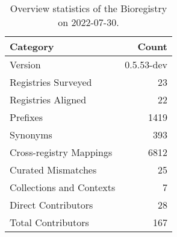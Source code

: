 \begin{table}
\centering
\caption{Overview statistics of the Bioregistry on 2022-07-30.}
\label{tab:bioregistry-summary}
\begin{tabular}{lr}
\toprule
                Category &      Count \\
\midrule
                 Version & 0.5.53-dev \\
     Registries Surveyed &         23 \\
      Registries Aligned &         22 \\
                Prefixes &       1419 \\
                Synonyms &        393 \\
 Cross-registry Mappings &       6812 \\
      Curated Mismatches &         25 \\
Collections and Contexts &          7 \\
     Direct Contributors &         28 \\
      Total Contributors &        167 \\
\bottomrule
\end{tabular}
\end{table}
